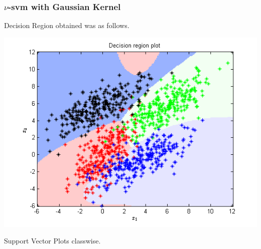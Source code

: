 \documentclass{article}
\begin{document}
\subsubsection{$\nu$-svm with Gaussian Kernel}
Decision Region obtained was as follows.
\begin{center}
\includegraphics[scale=1]{Classification/1c/nu_g/dec}
\end{center}
Support Vector Plots classwise.
\end{document}
